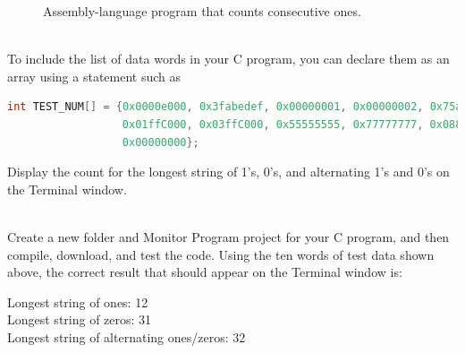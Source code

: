 \documentclass[epsfig,10pt,fullpage]{article}
\begin{document}
\begin{figure}[H]
\begin{center}

\end{center}
\caption{Assembly-language program that counts consecutive ones.}
\label{fig:shiftAND}
\end{figure}

~\\
\noindent
To include the list of data words in your C program, you can declare them as an array using
a statement such as

\noindent
\begin{lstlisting}[language=C]
int TEST_NUM[] = {0x0000e000, 0x3fabedef, 0x00000001, 0x00000002, 0x75a5a5a5, 
                  0x01ffC000, 0x03ffC000, 0x55555555, 0x77777777, 0x08888888, 
                  0x00000000};
\end{lstlisting}


\noindent
Display the count for the longest string of 1's, 0's, and alternating 1's and 0's
on the Terminal window.

~\\
\noindent
Create a new folder and Monitor Program project for your C program, and then compile,
download, and test the code. Using the ten words of test data shown above, the correct
result that should appear on the Terminal window is:

\begin{center}
Longest string of ones: 12\\
Longest string of zeros: 31\\
Longest string of alternating ones/zeros: 32\\
\end{center}
\end{document}
